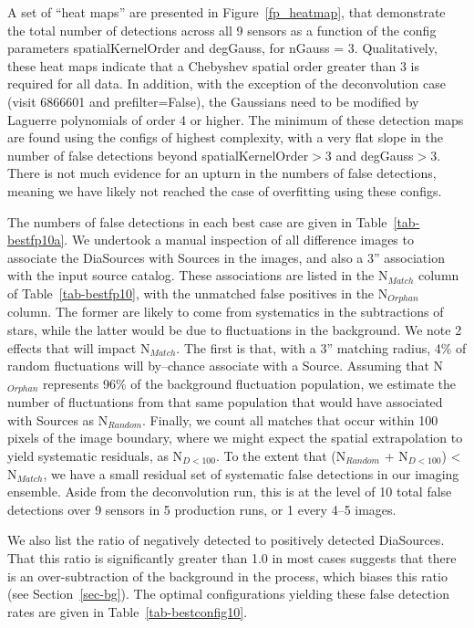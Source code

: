 \documentclass[prd, nofootinbib, floatfix, 11pt,tightenlines,times]{article}
\begin{document}
A set of ``heat maps'' are presented in Figure~\ref{fp_heatmap}, that
demonstrate the total number of detections across all 9 sensors as a
function of the config parameters spatialKernelOrder and degGauss, for
nGauss = 3.  Qualitatively, these heat maps indicate that a Chebyshev
spatial order greater than 3 is required for all data.  In addition,
with the exception of the deconvolution case (visit 6866601 and
prefilter=False), the Gaussians need to be modified by Laguerre
polynomials of order 4 or higher.  The minimum of these detection maps
are found using the configs of highest complexity, with a very flat
slope in the number of false detections beyond spatialKernelOrder$>$3
and degGauss$>$3.  There is not much evidence for an upturn in the
numbers of false detections, meaning we have likely not reached the
case of overfitting using these configs.

The numbers of false detections in each best case are given in
Table~\ref{tab-bestfp10a}.  We undertook a manual inspection of all
difference images to associate the DiaSources with Sources in the
images, and also a 3'' association with the input source catalog.
These associations are listed in the N$_{Match}$ column of
Table~\ref{tab-bestfp10}, with the unmatched false positives in the
N$_{Orphan}$ column.  The former are likely to come from systematics
in the subtractions of stars, while the latter would be due to
fluctuations in the background.  We note 2 effects that will impact
N$_{Match}$.  The first is that, with a 3'' matching radius, 4\% of
random fluctuations will by--chance associate with a Source.  Assuming
that N$_{Orphan}$ represents 96\% of the background fluctuation
population, we estimate the number of fluctuations from that same
population that would have associated with Sources as N$_{Random}$.
Finally, we count all matches that occur within 100 pixels of the
image boundary, where we might expect the spatial extrapolation to
yield systematic residuals, as N$_{D<100}$.  To the extent that
(N$_{Random}$ + N$_{D<100}$) < N$_{Match}$, we have a small residual
set of systematic false detections in our imaging ensemble.  Aside
from the deconvolution run, this is at the level of 10 total false
detections over 9 sensors in 5 production runs, or 1 every 4--5
images.

We also list the ratio of negatively detected to
positively detected DiaSources.  That this ratio is significantly
greater than 1.0 in most cases suggests that there is an
over-subtraction of the background in the process, which biases this
ratio (see Section~\ref{sec-bg}).  The optimal configurations yielding
these false detection rates are given in Table~\ref{tab-bestconfig10}.
\end{document}

